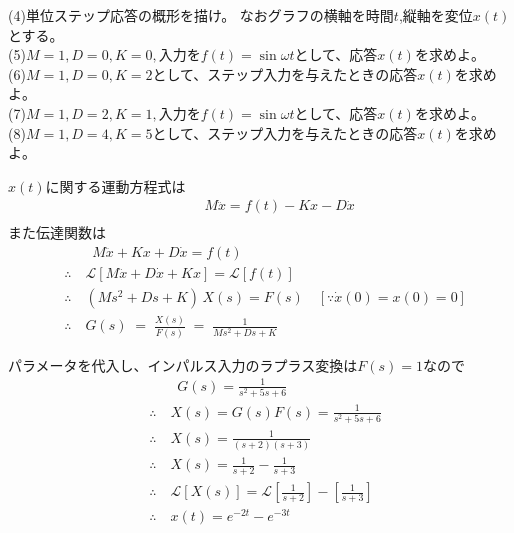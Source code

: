 \documentclass[a4paper,12pt]{article}
\begin{document}
\indent
(4)単位ステップ応答の概形を描け。
なおグラフの横軸を時間\(t\),縦軸を変位\(x(t)\)とする。\\

\indent
(5)\(M=1,D=0,K=0,\)入力を\(f(t)=\sin \omega t\)として、応答\(x(t)\)を求めよ。\\

\indent
(6)\(M=1,D=0,K=2\)として、ステップ入力を与えたときの応答\(x(t)\)を求めよ。\\

\indent
(7)\(M=1,D=2,K=1,\)入力を\(f(t)=\sin \omega t\)として、応答\(x(t)\)を求めよ。\\

\indent
(8)\(M=1,D=4,K=5\)として、ステップ入力を与えたときの応答\(x(t)\)を求めよ。\\
\begin{tcolorbox}[title={2. (1) 上図によって示されるシステムの運動方程式ならびに伝達関数を求めよ。}]
    \(x(t)\)に関する運動方程式は
    \begin{align*}
        &\qquad M\ddot{x} =f(t) -Kx - D \dot{x} \\
    \end{align*}
    また伝達関数は
    \begin{align*}
        &\qquad M\ddot{x} + Kx + D \dot{x} =f(t) \\
        &\therefore \quad \mathcal{L} \left[ M\ddot{x} + D \dot{x} + Kx\right] 
        =\mathcal{L} \left[ f(t) \right] \\
        &\therefore \quad (M s^2 + D s + K)\,X(s) = F(s) \quad [\because \dot{x}(0)=x(0)=0 ]\\
        &\therefore \quad G(s) \;=\;\frac{X(s)}{F(s)}
        \;=\;\frac{1}{M s^2 + D s + K}
    \end{align*}
    
\end{tcolorbox}

\begin{tcolorbox}[title={2. (2) 各パラメータを\(M=1,D=5,K=6\)として、インパルス応答を求めよ。}]
     パラメータを代入し、インパルス入力のラプラス変換は\(F(s)=1\)なので
     \vspace{-2mm}
     \begin{align*}
        &\qquad G(s) = \frac{1}{s^2 + 5s + 6} \\
        &\therefore \quad X(s) = G(s) F(s) = \frac{1}{s^2 + 5s + 6}\\
        &\therefore \quad X(s) = \frac{1}{(s+2)(s+3)}\\
        &\therefore \quad X(s) = \frac{1}{s+2} - \frac{1}{s+3}\\
        &\therefore \quad \mathcal{L} \left[ X(s)\right] 
        =\mathcal{L} \left[ \frac{1}{s+2}\right] - \left[\frac{1}{s+3}  \right] \\
        &\therefore \quad x(t) = e^{-2t} - e^{-3t}
    \end{align*}
\end{tcolorbox}
\end{document}
